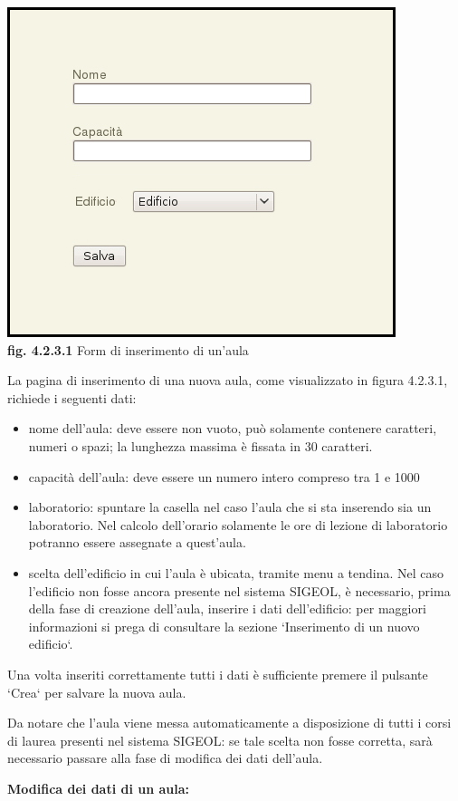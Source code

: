 \documentclass[11pt,a4paper]{article}
\begin{document}
\bigskip
\begin{center}
	\includegraphics[scale=0.5]{images/nuova_aula.jpg}\\
	\textbf{fig. 4.2.3.1} Form di inserimento di un'aula\\
\end{center}
\bigskip

La pagina di inserimento di una nuova aula, come visualizzato in figura 4.2.3.1, richiede i seguenti dati:
\begin{itemize}
 \item nome dell'aula: deve essere non vuoto, può solamente contenere caratteri, numeri o spazi; la lunghezza massima è fissata in 30 caratteri. 
 \item capacità dell'aula: deve essere un numero intero compreso tra 1 e 1000
 \item laboratorio: spuntare la casella nel caso l'aula che si sta inserendo sia un laboratorio. Nel calcolo dell'orario solamente le ore di lezione di laboratorio potranno essere assegnate a quest'aula.
 \item scelta dell'edificio in cui l'aula è ubicata, tramite menu a tendina. Nel caso l'edificio non fosse ancora presente nel sistema SIGEOL, è necessario, prima della fase di creazione dell'aula, inserire i dati dell'edificio: per maggiori informazioni si prega di consultare la sezione `Inserimento di un nuovo edificio`.
\end{itemize}
Una volta inseriti correttamente tutti i dati è sufficiente premere il pulsante `Crea` per salvare la nuova aula.

Da notare che l'aula viene messa automaticamente a disposizione di tutti i corsi di laurea presenti nel sistema SIGEOL: se tale scelta non fosse corretta, sarà necessario passare alla fase di modifica dei dati dell'aula.
\newline \newline
\begin{large}\textbf{Modifica dei dati di un aula:}\end{large}
\end{document}
